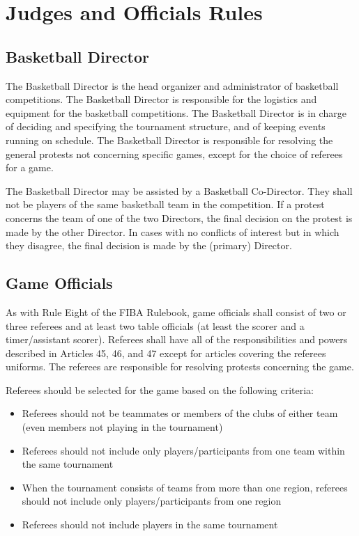 \chapter{Judges and Officials Rules}

\section{Basketball Director}

The Basketball Director is the head organizer and administrator of basketball competitions.
The Basketball Director is responsible for the logistics and equipment for the basketball
competitions. The Basketball Director is in charge of deciding and specifying the
tournament structure, and of keeping events running on schedule. The Basketball
Director is responsible for resolving the general protests not concerning specific games,
except for the choice of referees for a game.

The Basketball Director may be assisted by a Basketball Co-Director. They shall not be
players of the same basketball team in the competition. If a protest concerns the team of
one of the two Directors, the final decision on the protest is made by the other Director.
In cases with no conflicts of interest but in which they disagree, the final decision is
made by the (primary) Director.

\section{Game Officials}

As with Rule Eight of the FIBA Rulebook, game officials shall consist of two or three referees 
and at least two table officials (at least the scorer and a timer/assistant scorer). 
Referees shall have all of the responsibilities and powers described in Articles 45, 46, and 47 
except for articles covering the referees uniforms. The referees are responsible for resolving protests concerning the game.

Referees should be selected for the game based on the following criteria:

\begin{itemize}
  \item Referees should not be teammates or members of the clubs of either team (even members not playing in the tournament)
  \item Referees should not include only players/participants from one team within the same tournament
  \item When the tournament consists of teams from more than one region, referees should not include only players/participants from one region
  \item Referees should not include players in the same tournament
\end{itemize}

